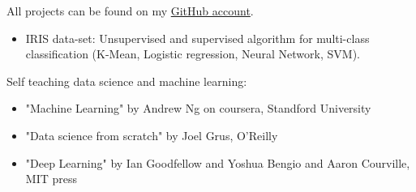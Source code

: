 \documentclass[10pt,a4paper,ragged2e]{altacv}
\begin{document}

\begin{fullwidth}
\makecvheader
\end{fullwidth}



All projects can be found on my \href{https://github.com/ArnaudL-IT}{GitHub account}.
\begin{itemize}
    \item IRIS data-set: Unsupervised and supervised algorithm for multi-class classification (K-Mean, Logistic regression, Neural Network, SVM).
\end{itemize}

\divider

Self teaching data science and machine learning:
\begin{itemize}
    \item "Machine Learning" by Andrew Ng on coursera, Standford University
    \item "Data science from scratch" by Joel Grus, O'Reilly
    \item "Deep Learning" by Ian Goodfellow and Yoshua Bengio and Aaron Courville, MIT press
\end{itemize}
\end{document}
